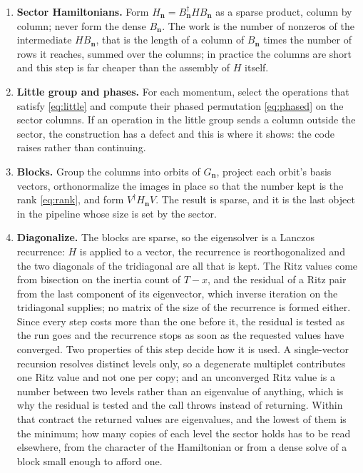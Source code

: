 \documentclass[12pt]{article}
\newcommand{\Gk}{G_{\mathbf{n}}}
\begin{document}
\begin{enumerate}
\item \textbf{Sector Hamiltonians.} Form $H_{\mathbf{n}} =
B_{\mathbf{n}}^{\dagger}HB_{\mathbf{n}}$ as a sparse product, column by column;
never form the dense $B_{\mathbf{n}}$. The work is the number of nonzeros of the
intermediate $HB_{\mathbf{n}}$, that is the length of a column of
$B_{\mathbf{n}}$ times the number of rows it reaches, summed over the columns;
in practice the columns are short and this step is far cheaper than the
assembly of $H$ itself.

\item \textbf{Little group and phases.} For each momentum, select the operations
that satisfy \eqref{eq:little} and compute their phased permutation
\eqref{eq:phased} on the sector columns. If an operation in the little group
sends a column outside the sector, the construction has a defect and this is
where it shows: the code raises rather than continuing.

\item \textbf{Blocks.} Group the columns into orbits of $\Gk$, project each
orbit's basis vectors, orthonormalize the images in place so that the number kept
is the rank \eqref{eq:rank}, and form $V^{\dagger}H_{\mathbf{n}}V$. The result is
sparse, and it is the last object in the pipeline whose size is set by the
sector.

\item \textbf{Diagonalize.} The blocks are sparse, so the eigensolver is a
Lanczos recurrence: $H$ is applied to a vector, the recurrence is reorthogonalized
and the two diagonals of the tridiagonal are all that is kept. The Ritz values
come from bisection on the inertia count of $T - x$, and the residual of a Ritz
pair from the last component of its eigenvector, which inverse iteration on the
tridiagonal supplies; no matrix of the size of the recurrence is formed either.
Since every step costs more than the one before it, the residual is tested as
the run goes and the recurrence stops as soon as the requested values have
converged.
Two properties of this step decide how it is used. A single-vector recursion
resolves distinct levels only, so a degenerate multiplet contributes one Ritz
value and not one per copy; and an unconverged Ritz value is a number between two
levels rather than an eigenvalue of anything, which is why the residual is tested
and the call throws instead of returning. Within that contract the returned
values are eigenvalues, and the lowest of them is the minimum; how many copies of
each level the sector holds has to be read elsewhere, from the character of the
Hamiltonian or from a dense solve of a block small enough to afford one.
\end{enumerate}
\end{document}
